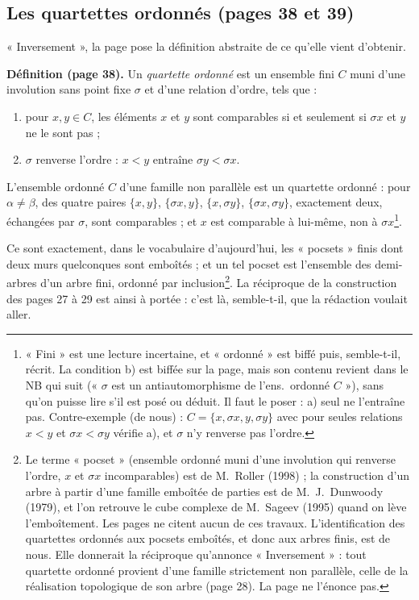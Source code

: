 \documentclass[11pt,a4paper]{article}
\begin{document}
\subsection*{Les quartettes ordonnés (pages 38 et 39)}

« Inversement », la page pose la définition abstraite de ce qu'elle vient
d'obtenir.

\textbf{Définition (page 38).} Un \emph{quartette ordonné} est un ensemble
fini $C$ muni d'une involution sans point fixe $\sigma$ et d'une relation
d'ordre, tels que :
\begin{enumerate}
  \item[a)] pour $x, y \in C$, les éléments $x$ et $y$ sont comparables si et
  seulement si $\sigma x$ et $y$ ne le sont pas ;
  \item[b)] $\sigma$ renverse l'ordre : $x < y$ entraîne $\sigma y < \sigma
  x$.
\end{enumerate}
L'ensemble ordonné $C$ d'une famille non parallèle est un quartette ordonné :
pour $\alpha \neq \beta$, des quatre paires $\{x, y\}$, $\{\sigma x, y\}$,
$\{x, \sigma y\}$, $\{\sigma x, \sigma y\}$, exactement deux, échangées par
$\sigma$, sont comparables ; et $x$ est comparable à lui-même, non à $\sigma
x$\footnote{« Fini » est une lecture incertaine, et « ordonné » est biffé
puis, semble-t-il, récrit. La condition b) est biffée sur la page, mais son
contenu revient dans le NB qui suit (« $\sigma$ est un antiautomorphisme de
l'ens.\ ordonné $C$ »), sans qu'on puisse lire s'il est posé ou déduit. Il
faut le poser : a) seul ne l'entraîne pas. Contre-exemple (de nous) : $C =
\{x, \sigma x, y, \sigma y\}$ avec pour seules relations $x < y$ et $\sigma x
< \sigma y$ vérifie a), et $\sigma$ n'y renverse pas l'ordre.}.

Ce sont exactement, dans le vocabulaire d'aujourd'hui, les « pocsets » finis
dont deux murs quelconques sont emboîtés ; et un tel pocset est l'ensemble
des demi-arbres d'un arbre fini, ordonné par inclusion\footnote{Le terme
« pocset » (ensemble ordonné muni d'une involution qui renverse l'ordre,
$x$ et $\sigma x$ incomparables) est de M.~Roller (1998) ; la construction
d'un arbre à partir d'une famille emboîtée de parties est de M.~J.~Dunwoody
(1979), et l'on retrouve le cube complexe de M.~Sageev (1995) quand on lève
l'emboîtement. Les pages ne citent aucun de ces travaux. L'identification des quartettes ordonnés aux
pocsets emboîtés, et donc aux arbres finis, est de nous. Elle donnerait la
réciproque qu'annonce « Inversement » : tout quartette ordonné provient d'une
famille strictement non parallèle, celle de la réalisation topologique de
son arbre (page 28). La page ne l'énonce pas.}. La réciproque de la
construction des pages 27 à 29 est ainsi à portée : c'est là, semble-t-il,
que la rédaction voulait aller.
\end{document}
